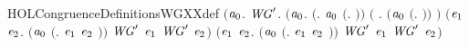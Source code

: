 \begin{SaveVerbatim}{HOLCongruenceDefinitionsWGXXdef}
\HOLTokenTurnstile{}  \HOLSymConst{\ensuremath{=}}
   \ensuremath{(}\HOLTokenLambda{}\ensuremath{\HOLBoundVar{a}\sb{\mathrm{0}}}.
        \HOLSymConst{\HOLTokenForall{}}\ensuremath{\HOLBoundVar{WG}\sp{\prime}}.
            \ensuremath{(}\HOLSymConst{\HOLTokenForall{}}\ensuremath{\HOLBoundVar{a}\sb{\mathrm{0}}}.
                 \ensuremath{(}\HOLSymConst{\HOLTokenExists{}}. \ensuremath{\HOLBoundVar{a}\sb{\mathrm{0}}} \HOLSymConst{\ensuremath{=}} \ensuremath{(}\HOLTokenLambda{}. \ensuremath{)}\ensuremath{)} \HOLSymConst{\HOLTokenDisj{}}
                 \ensuremath{(}\HOLSymConst{\HOLTokenExists{}} . \ensuremath{(}\ensuremath{\HOLBoundVar{a}\sb{\mathrm{0}}} \HOLSymConst{\ensuremath{=}} \ensuremath{(}\HOLTokenLambda{}. \HOLSymConst{\ensuremath{\ldotp}} \ensuremath{)}\ensuremath{)} \HOLSymConst{\HOLTokenConj{}}  \ensuremath{)} \HOLSymConst{\HOLTokenDisj{}}
                 \ensuremath{(}\HOLSymConst{\HOLTokenExists{}}\ensuremath{\HOLBoundVar{e}\sb{\mathrm{1}}} \ensuremath{\HOLBoundVar{e}\sb{\mathrm{2}}}.
                      \ensuremath{(}\ensuremath{\HOLBoundVar{a}\sb{\mathrm{0}}} \HOLSymConst{\ensuremath{=}} \ensuremath{(}\HOLTokenLambda{}. \ensuremath{\HOLBoundVar{e}\sb{\mathrm{1}}}  \HOLSymConst{\ensuremath{+}} \ensuremath{\HOLBoundVar{e}\sb{\mathrm{2}}} \ensuremath{)}\ensuremath{)} \HOLSymConst{\HOLTokenConj{}} \ensuremath{\HOLBoundVar{WG}\sp{\prime}} \ensuremath{\HOLBoundVar{e}\sb{\mathrm{1}}} \HOLSymConst{\HOLTokenConj{}} \ensuremath{\HOLBoundVar{WG}\sp{\prime}} \ensuremath{\HOLBoundVar{e}\sb{\mathrm{2}}}\ensuremath{)} \HOLSymConst{\HOLTokenDisj{}}
                 \ensuremath{(}\HOLSymConst{\HOLTokenExists{}}\ensuremath{\HOLBoundVar{e}\sb{\mathrm{1}}} \ensuremath{\HOLBoundVar{e}\sb{\mathrm{2}}}.
                      \ensuremath{(}\ensuremath{\HOLBoundVar{a}\sb{\mathrm{0}}} \HOLSymConst{\ensuremath{=}} \ensuremath{(}\HOLTokenLambda{}. \ensuremath{\HOLBoundVar{e}\sb{\mathrm{1}}}  \HOLSymConst{\ensuremath{\mid}} \ensuremath{\HOLBoundVar{e}\sb{\mathrm{2}}} \ensuremath{)}\ensuremath{)} \HOLSymConst{\HOLTokenConj{}} \ensuremath{\HOLBoundVar{WG}\sp{\prime}} \ensuremath{\HOLBoundVar{e}\sb{\mathrm{1}}} \HOLSymConst{\HOLTokenConj{}} \ensuremath{\HOLBoundVar{WG}\sp{\prime}} \ensuremath{\HOLBoundVar{e}\sb{\mathrm{2}}}\ensuremath{)} \HOLSymConst{\HOLTokenDisj{}}

\end{SaveVerbatim}
